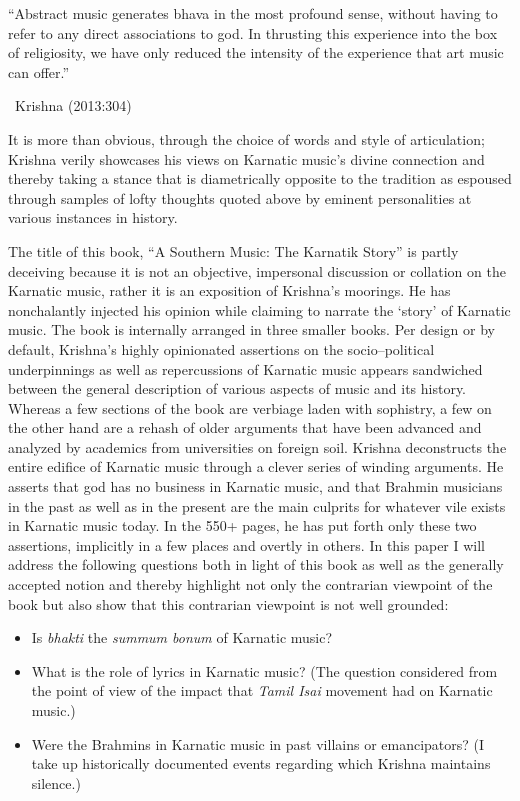 \begin{myquote}
“Abstract music generates bhava in the most profound sense, without having to refer to any direct associations to god. In thrusting this experience into the box of religiosity, we have only reduced the intensity of the experience that art music can offer.” 

~\hfill Krishna (2013:304)
\end{myquote}

It is more than obvious, through the choice of words and style of articulation; Krishna verily showcases his views on Karnatic music’s divine connection and thereby taking a stance that is diametrically opposite to the tradition as espoused through samples of lofty thoughts quoted above by eminent personalities at various instances in history.

The title of this book, “A Southern Music: The Karnatik Story” is partly deceiving because it is not an objective, impersonal discussion or collation on the Karnatic music, rather it is an exposition of Krishna’s moorings. He has nonchalantly injected his opinion while claiming to narrate the ‘story’ of Karnatic music. The book is internally arranged in three smaller books. Per design or by default, Krishna’s highly opinionated assertions on the socio–political underpinnings as well as repercussions of Karnatic music appears sandwiched between the general description of various aspects of music and its history. Whereas a few sections of the book are verbiage laden with sophistry, a few on the other hand are a rehash of older arguments that have been advanced and analyzed by academics from universities on foreign soil. Krishna deconstructs the entire edifice of Karnatic music through a clever series of winding arguments. He asserts that god has no business in Karnatic music, and that Brahmin musicians in the past as well as in the present are the main culprits for whatever vile exists in Karnatic music today. In the 550+ pages, he has put forth only these two assertions, implicitly in a few places and overtly in others. In this paper I will address the following questions both in light of this book as well as the generally accepted notion and thereby highlight not only the contrarian viewpoint of the book but also show that this contrarian viewpoint is not well grounded:

\begin{itemize}
\itemsep=0pt
\item Is \textit{bhakti} the \textit{summum bonum} of Karnatic music?

 \item What is the role of lyrics in Karnatic music? (The question considered from the point of view of the impact that \textit{Tamil Isai} movement had on Karnatic music.)

 \item Were the Brahmins in Karnatic music in past villains or emancipators? (I take up historically documented events regarding which Krishna maintains silence.)

\end{itemize}

